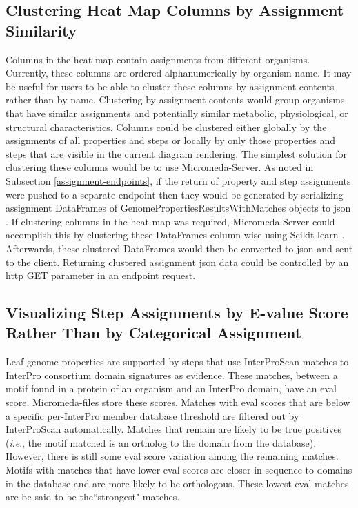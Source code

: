 \subsection{Clustering Heat Map Columns by Assignment Similarity}

Columns in the heat map contain assignments from different organisms. Currently, 
these columns are ordered alphanumerically by organism name. It may be useful 
for users to be able to cluster these columns by assignment contents rather than 
by name. Clustering by assignment contents would group organisms that have 
similar assignments and potentially similar metabolic, physiological, or 
structural characteristics. Columns could be clustered either globally by the 
assignments of all properties and steps or locally by only those properties and 
steps that are visible in the current diagram rendering. The simplest solution 
for clustering these columns would be to use Micromeda-Server. As noted in 
Subsection \ref{assignment-endpoints}, if the return of property and step 
assignments were pushed to a separate endpoint then they would be generated by 
serializing assignment DataFrames of GenomePropertiesResultsWithMatches objects 
to \gls{json} \cite{bray2014rfc}. If clustering columns in the heat map was 
required, Micromeda-Server could accomplish this by clustering these DataFrames 
column-wise using Scikit-learn \cite{pedregosa2011scikit}. Afterwards, these 
clustered DataFrames would then be converted to \gls{json} and sent to the 
client. Returning clustered assignment \gls{json} data could be controlled by an 
\gls{http} GET parameter in an endpoint request.

\subsection{Visualizing Step Assignments by E-value Score Rather Than by 
Categorical Assignment} \label{interface-e-value}

Leaf genome properties are supported by steps that use InterProScan matches to 
InterPro consortium domain signatures as evidence. These matches, between a 
motif found in a protein of an organism and an InterPro domain, have an 
\gls{eval} score. Micromeda-files store these scores. Matches with \gls{eval} 
scores that are below a specific per-InterPro member database threshold are 
filtered out by InterProScan automatically. Matches that remain are likely to be 
true positives (\textit{i}.\textit{e}., the motif matched is an ortholog to the domain from the 
database). However, there is still some \gls{eval} score variation among the 
remaining matches. Motifs with matches that have lower \gls{eval} scores are 
closer in sequence to domains in the database and are more likely to be 
orthologous. These lowest \gls{eval} matches are be said to be the``strongest" 
matches.

